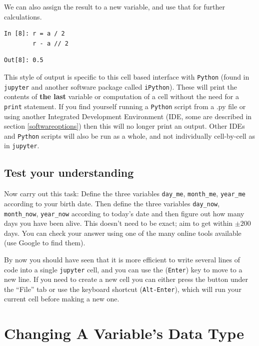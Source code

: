 \noindent We can also assign the result to a new variable, and use that for further calculations.
\begin{lstlisting}[style=PY]
In [8]: r = a / 2
        r - a // 2
\end{lstlisting}
\begin{lstlisting}[style=PY, backgroundcolor=\color{white}]
Out[8]: 0.5
\end{lstlisting}


\begin{tcolorbox}[colback=red!5!white,colframe=red!75!black]
This style of output is specific to this cell based interface with \texttt{Python} (found in \texttt{jupyter} and another software package called \texttt{iPython}). These will print the contents of \textbf{the last} variable or computation of a cell without the need for a \texttt{print} statement. If you find yourself running a \texttt{Python} script from a .py file or using another Integrated Development Environment (IDE, some are described in section \ref{softwareoptions}) then this will no longer print an output. Other IDEs and \texttt{Python} scripts will also be run as a whole, and not individually cell-by-cell as in \texttt{jupyter}.
\end{tcolorbox}

\subsection{Test your understanding}
Now carry out this task: Define the three variables \texttt{day\_me}, \texttt{month\_me}, \texttt{year\_me} according to your birth date. Then define the three variables \texttt{day\_now}, \texttt{month\_now}, \texttt{year\_now} according to today's date and then figure out how many days you have been alive. This doesn't need to be exact; aim to get within $\pm 200$ days. You can check your answer using one of the many online tools available (use Google to find them).

By now you should have seen that it is more efficient to write several lines of code into a single \texttt{jupyter} cell, and you can use the \keys{\enter} ({\tt Enter}) key to move to a new line. If you need to create a new cell you can either press the \keys{{+}} button under the ``File'' tab or use the keyboard shortcut \keys{\Alt+\enter} ({\tt Alt-Enter}), which will run your current cell before making a new one.

\section{Changing A Variable's Data Type}

